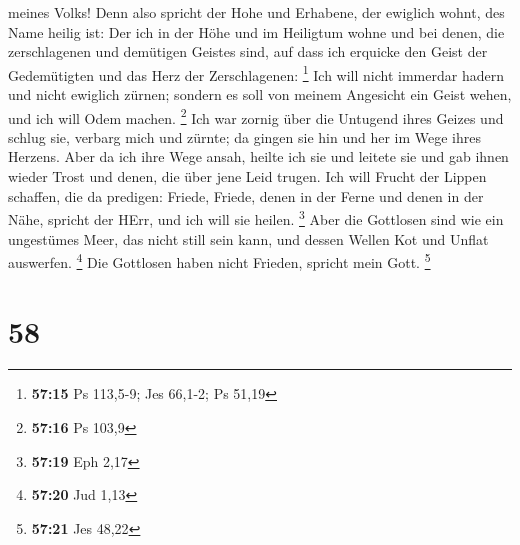 meines Volks!  Denn also spricht der Hohe und Erhabene, der
ewiglich wohnt, des Name heilig ist: Der ich in der Höhe und im
Heiligtum wohne und bei denen, die zerschlagenen und demütigen Geistes
sind, auf dass ich erquicke den Geist der Gedemütigten und das Herz der
Zerschlagenen: \footnote{\textbf{57:15} Ps 113,5-9; Jes 66,1-2; Ps 51,19}
 Ich will nicht immerdar hadern und nicht ewiglich zürnen;
sondern es soll von meinem Angesicht ein Geist wehen, und ich will Odem
machen. \footnote{\textbf{57:16} Ps 103,9}  Ich war zornig
über die Untugend ihres Geizes und schlug sie, verbarg mich und zürnte;
da gingen sie hin und her im Wege ihres Herzens.  Aber da
ich ihre Wege ansah, heilte ich sie und leitete sie und gab ihnen wieder
Trost und denen, die über jene Leid trugen.  Ich will
Frucht der Lippen schaffen, die da predigen: Friede, Friede, denen in
der Ferne und denen in der Nähe, spricht der HErr, und ich will sie
heilen. \footnote{\textbf{57:19} Eph 2,17}  Aber die
Gottlosen sind wie ein ungestümes Meer, das nicht still sein kann, und
dessen Wellen Kot und Unflat auswerfen. \footnote{\textbf{57:20} Jud
  1,13}  Die Gottlosen haben nicht Frieden, spricht mein
Gott. \footnote{\textbf{57:21} Jes 48,22}

\hypertarget{section-22}{%
\section{58}\label{section-22}}

